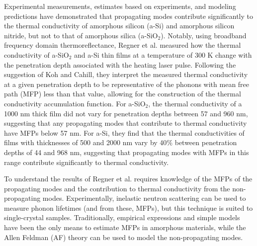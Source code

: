 Experimental measurements, estimates based on experiments, 
and modeling predictions have demonstrated that propagating modes 
contribute
significantly to the thermal conductivity of amorphous silicon (a-Si)
\cite{feldman_thermal_1993,cahill_thermal_1994,
feldman_numerical_1999,liu_high_2009,yang_anomalously_2010,
he_heat_2011,regner_broadband_2013} 
and amorphous silicon nitride,
\cite{sultan_heat_2013} but not to that of 
amorphous silica (a-SiO$_2$).
\cite{love_estimate_1990,lee_heat_1997,baldi_thermal_2008,
regner_broadband_2013} 
Notably, using broadband frequency domain thermoreflectance, 
Regner et al. measured how the thermal conductivity of a-SiO$_2$ and 
a-Si thin films at a temperature of 300 K change with the penetration 
depth associated with the 
heating laser pulse.\cite{regner_broadband_2013} 
Following the suggestion of Koh and Cahill,\cite{koh_frequency_2007} 
they interpret the 
measured thermal conductivity at a given penetration depth to be 
representative 
of the phonons with mean free path (MFP) less than that value, 
allowing for the 
construction of the thermal conductivity accumulation 
function.\cite{dames_thermal_2005,minnich_thermal_2011,
yang_mean_2013} 
For a-SiO$_2$, the thermal conductivity of a 1000 nm thick 
film did not vary for penetration depths between 57 and 960 nm, 
suggesting that any propagating modes that contribute to thermal 
conductivity have MFPs below 57 nm. For a-Si, they find that the 
thermal conductivities of films with thicknesses of 500 and 2000 nm 
vary by 
40$\%$ between penetration depths of 44 and 968 nm, suggesting 
that propagating modes with MFPs in this range contribute 
significantly to thermal conductivity.  

To understand the results of Regner et al. requires knowledge of 
the MFPs of the 
propagating modes and the contribution to thermal conductivity 
from the non-propagating modes. 
Experimentally, inelastic neutron scattering can be 
used to measure phonon lifetimes (and from these, MFPs),
but this technique is suited to single-crystal samples.
\cite{christianson_phonon_2008} 
Traditionally, empirical expressions and
simple models have been the only means
to estimate MFPs in amorphous materials,
\cite{zeller_thermal_1971,graebner_phonon_1986,
freeman_thermal_1986,cahill_lattice_1988,cahill_heat_1989} 
while the Allen Feldman (AF) theory can be used to model the 
non-propagating modes.\cite{allen_thermal_1993,feldman_thermal_1993}

